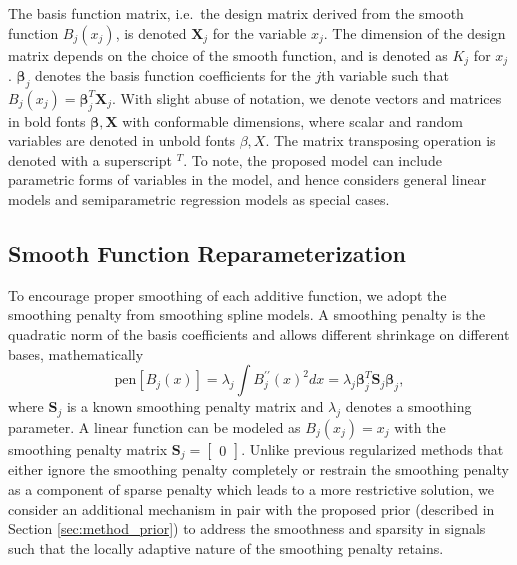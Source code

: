 \documentclass[AMA,STIX1COL,]{WileyNJD-v2}
\begin{document}
The basis function matrix, i.e.~the design matrix derived from the
smooth function \(B_j(x_j)\), is denoted \(\boldsymbol{X}_j\) for the
variable \(x_j\). The dimension of the design matrix depends on the
choice of the smooth function, and is denoted as \(K_j\) for \(x_j\).
\(\boldsymbol{\beta}_j\) denotes the basis function coefficients for the
\(j\)th variable such that
\(B_j(x_j) = \boldsymbol{\beta}_j^T \boldsymbol{X}_j\). With slight
abuse of notation, we denote vectors and matrices in bold fonts
\(\boldsymbol{\beta}, \boldsymbol{X}\) with conformable dimensions,
where scalar and random variables are denoted in unbold fonts
\(\beta, X\). The matrix transposing operation is denoted with a
superscript \(^T\). To note, the proposed model can include parametric
forms of variables in the model, and hence considers general linear
models and semiparametric regression models as special cases.

\subsection{Smooth Function Reparameterization}

To encourage proper smoothing of each additive function, we adopt the
smoothing penalty from smoothing spline models\citep{Wood2017}. A
smoothing penalty is the quadratic norm of the basis coefficients and
allows different shrinkage on different bases, mathematically
\begin{equation}
  \text{pen}\left[B_j(x)\right] = \lambda_j \int B^{\prime\prime}_j(x)^2dx = \lambda_j \boldsymbol{\beta}_j^T \boldsymbol{S}_j \boldsymbol{\beta}_j ,\nonumber
\end{equation} where \(\boldsymbol{S}_j\) is a known smoothing penalty
matrix and \(\lambda_j\) denotes a smoothing parameter. A linear
function can be modeled as \(B_j(x_j) = x_j\) with the smoothing penalty
matrix \(\boldsymbol{S}_j = \begin{bmatrix}0\end{bmatrix}\). Unlike
previous regularized methods that either ignore the smoothing penalty
completely or restrain the smoothing penalty as a component of sparse
penalty which leads to a more restrictive solution, we consider an
additional mechanism in pair with the proposed prior (described in
Section \ref{sec:method_prior}) to address the smoothness and sparsity
in signals such that the locally adaptive nature of the smoothing
penalty retains.
\end{document}
